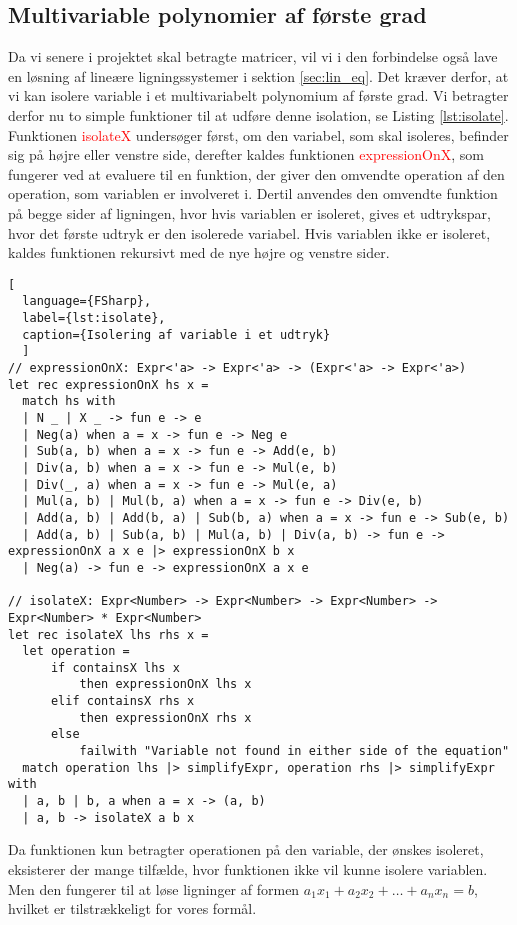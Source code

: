 \subsection{Multivariable polynomier af første grad}
Da vi senere i projektet skal betragte matricer, vil vi i den forbindelse også lave en løsning af lineære ligningssystemer i sektion \ref{sec:lin_eq}. Det kræver derfor, at vi kan isolere variable i et multivariabelt polynomium af første grad. Vi betragter derfor nu to simple funktioner til at udføre denne isolation, se Listing \ref{lst:isolate}. Funktionen \textcolor{red}{isolateX} undersøger først, om den variabel, som skal isoleres, befinder sig på højre eller venstre side, derefter kaldes funktionen \textcolor{red}{expressionOnX}, som fungerer ved at evaluere til en funktion, der giver den omvendte operation af den operation, som variablen er involveret i. Dertil anvendes den omvendte funktion på begge sider af ligningen, hvor hvis variablen er isoleret, gives et udtrykspar, hvor det første udtryk er den isolerede variabel. Hvis variablen ikke er isoleret, kaldes funktionen rekursivt med de nye højre og venstre sider.

\begin{lstlisting}[
  language={FSharp}, 
  label={lst:isolate}, 
  caption={Isolering af variable i et udtryk}
  ]
// expressionOnX: Expr<'a> -> Expr<'a> -> (Expr<'a> -> Expr<'a>)
let rec expressionOnX hs x =
  match hs with
  | N _ | X _ -> fun e -> e
  | Neg(a) when a = x -> fun e -> Neg e
  | Sub(a, b) when a = x -> fun e -> Add(e, b)
  | Div(a, b) when a = x -> fun e -> Mul(e, b)
  | Div(_, a) when a = x -> fun e -> Mul(e, a)
  | Mul(a, b) | Mul(b, a) when a = x -> fun e -> Div(e, b)
  | Add(a, b) | Add(b, a) | Sub(b, a) when a = x -> fun e -> Sub(e, b)
  | Add(a, b) | Sub(a, b) | Mul(a, b) | Div(a, b) -> fun e -> expressionOnX a x e |> expressionOnX b x 
  | Neg(a) -> fun e -> expressionOnX a x e

// isolateX: Expr<Number> -> Expr<Number> -> Expr<Number> -> Expr<Number> * Expr<Number> 
let rec isolateX lhs rhs x =
  let operation = 
      if containsX lhs x 
          then expressionOnX lhs x
      elif containsX rhs x 
          then expressionOnX rhs x
      else 
          failwith "Variable not found in either side of the equation"
  match operation lhs |> simplifyExpr, operation rhs |> simplifyExpr with
  | a, b | b, a when a = x -> (a, b)
  | a, b -> isolateX a b x
\end{lstlisting}

Da funktionen kun betragter operationen på den variable, der ønskes isoleret, eksisterer der mange tilfælde, hvor funktionen ikke vil kunne isolere variablen. Men den fungerer til at løse ligninger af formen \(a_1x_1 + a_2x_2 + \ldots + a_nx_n = b\), hvilket er tilstrækkeligt for vores formål.
